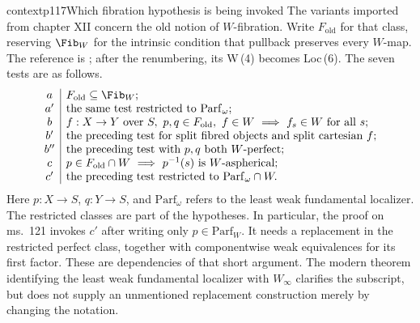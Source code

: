 \begin{dcomment}{context}{p117}{Which fibration hypothesis is being invoked}
The variants imported from chapter XII concern the old notion of $W$-fibration. Write $F_{\mathrm{old}}$ for that class, reserving $\Fib_W$ for the intrinsic condition that pullback preserves every $W$-map. The reference is \citet[ms.~53]{Grothendieck1990XIIa}; after the renumbering, its W\,(4) becomes Loc\,(6). The seven tests are as follows.
\[
\begin{array}{c|l}
 a&F_{\mathrm{old}}\subseteq\Fib_W;\\
 a'&\text{the same test restricted to }\mathrm{Parf}_{\omega};\\
 b&f:X\to Y\text{ over }S,\ p,q\in F_{\mathrm{old}},\ f\in W
       \ \Longrightarrow\ f_s\in W\text{ for all }s;\\
 b'&\text{the preceding test for split fibred objects and split cartesian }f;\\
 b''&\text{the preceding test with }p,q\text{ both }W\text{-perfect};\\
 c&p\in F_{\mathrm{old}}\cap W\ \Longrightarrow\ p^{-1}(s)\text{ is }W\text{-aspherical};\\
 c'&\text{the preceding test restricted to }\mathrm{Parf}_{\omega}\cap W.
\end{array}
\]
Here $p:X\to S$, $q:Y\to S$, and $\mathrm{Parf}_{\omega}$ refers to the least weak fundamental localizer. The restricted classes are part of the hypotheses. In particular, the proof on ms.~121 invokes $c'$ after writing only $p\in\mathrm{Parf}_W$. It needs a replacement in the restricted perfect class, together with componentwise weak equivalences for its first factor. These are dependencies of that short argument. The modern theorem identifying the least weak fundamental localizer with $W_\infty$ clarifies the subscript, but does not supply an unmentioned replacement construction merely by changing the notation.
\end{dcomment}

